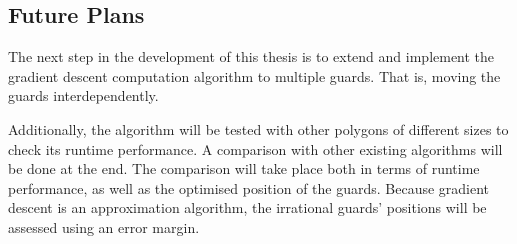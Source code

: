 
\subsection{Future Plans}
The next step in the development of this thesis is to extend and implement the gradient descent computation algorithm to multiple guards. That is, moving the guards interdependently.

Additionally, the algorithm will be tested with other polygons of different sizes to check its runtime performance. A comparison with other existing algorithms will be done at the end. The comparison will take place both in terms of runtime performance, as well as the optimised position of the guards. Because gradient descent is an approximation algorithm, the irrational guards' positions will be assessed using an error margin.


